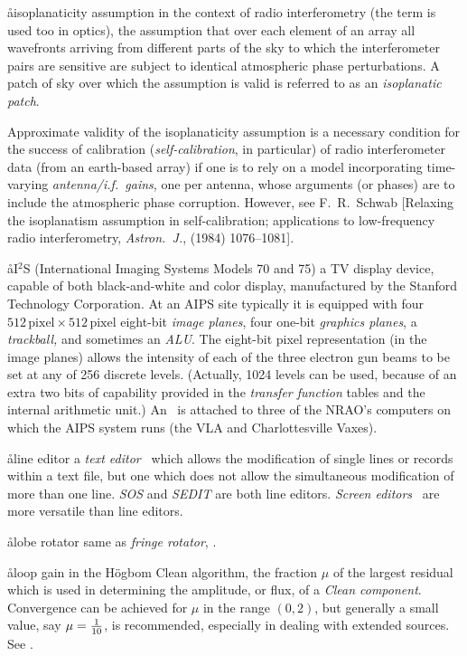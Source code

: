 \aa{isoplanaticity assumption}
in the context
of radio interferometry (the term is used too in optics),
the assumption that over each element of an array
all wavefronts arriving from different parts of the sky
to which the interferometer pairs are sensitive
are subject to identical atmospheric phase perturbations.
A patch of sky over which the assumption is valid
is referred to as an {\it isoplanatic patch}.
\par
Approximate validity of the isoplanaticity assumption
is a necessary condition for the success of calibration
({\it self-calibration}, in particular) of radio interferometer
data (from an earth-based array)
if one is to rely on a model incorporating
time-varying {\it antenna/i.f.\ gains}, one per antenna,
whose arguments (or phases) are to include the atmospheric
phase corruption.
However, see F.~R.~Schwab [Relaxing the isoplanatism assumption
in self-calibration; applications to low-frequency radio
interferometry, {\it Astron.~J.},  (1984) 1076--1081].

\aa{I$^2$S}
(International Imaging Systems Models 70 and 75) a TV display device,
capable of both black-and-white and color display,
manufactured by the Stanford Technology Corporation.
At an AIPS site typically it is equipped with four
$512\,\text{pixel}\times512\,\text{pixel}$ eight-bit {\it image planes},
four one-bit
{\it graphics planes}, a {\it trackball,} and sometimes an {\it ALU}.
The eight-bit pixel representation (in the image planes)
allows the intensity of
each of the three electron gun beams to be set at any of 256
discrete levels.
(Actually, 1024 levels can be used, because of an
extra two bits of capability provided in the
{\it transfer function} tables and the internal arithmetic unit.)
An \iis\ is attached to three of the NRAO's computers
on which the AIPS system runs (the VLA and Charlottesville Vaxes).

\aa{line editor}
a {\it text editor} \qv\ which allows the modification
of single lines or records within a text file,
but one which does not allow the simultaneous modification
of more than one line.
{\it SOS} and {\it SEDIT} are both line editors.
{\it Screen editors} \qv\ are more versatile than line editors.

\aa{lobe rotator}
same as {\it fringe rotator}, \qv.

\aa{loop gain}
in the H\"ogbom Clean algorithm, the fraction $\mu$ of the
largest residual which is used in determining the amplitude, or flux,
of a {\it Clean component}.
Convergence can be achieved for $\mu$ in the range $(0,2)$,
but generally a small value, say $\mu={1\over10}$,
is recommended, especially in dealing with extended sources.
See \hca.


